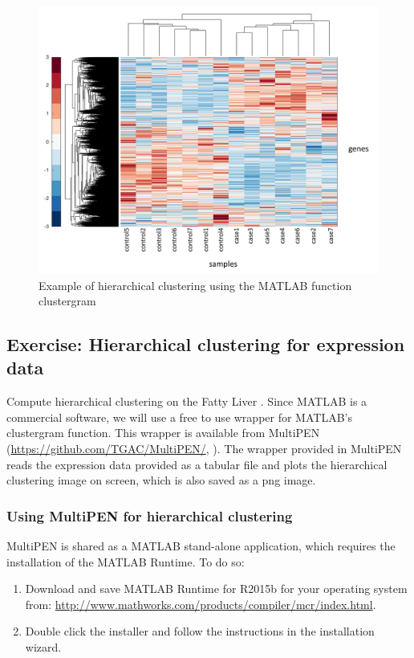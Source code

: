 \documentclass[11pt, oneside]{article}   	%
\begin{document}
\begin{figure}[!ht]
	\includegraphics[width=\textwidth]{hierarchical-clustering}
	\caption{Example of hierarchical clustering using the MATLAB function clustergram}
	\label{fig:hierarchical-clustering}
\end{figure}


\subsection{Exercise: Hierarchical clustering for expression data}

Compute hierarchical clustering on the Fatty Liver \cite{Wruck2015}.
Since MATLAB is a commercial software, we will use a free to use wrapper for MATLAB's clustergram function. This wrapper is available from MultiPEN (\url{https://github.com/TGAC/MultiPEN/}, \cite{Rey2017}). The wrapper provided in MultiPEN reads the expression data provided as a tabular file and plots the hierarchical clustering image on screen, which is also saved as a png image. 

\subsubsection{Using MultiPEN for hierarchical clustering}

MultiPEN is shared as a MATLAB stand-alone application, which requires the installation of the MATLAB Runtime. To do so:

\begin{enumerate}

   \item Download and save MATLAB Runtime for R2015b for your operating system from: \url{http://www.mathworks.com/products/compiler/mcr/index.html}.

   \item Double click the installer and follow the instructions in the installation wizard.

\end{enumerate}
\end{document}

